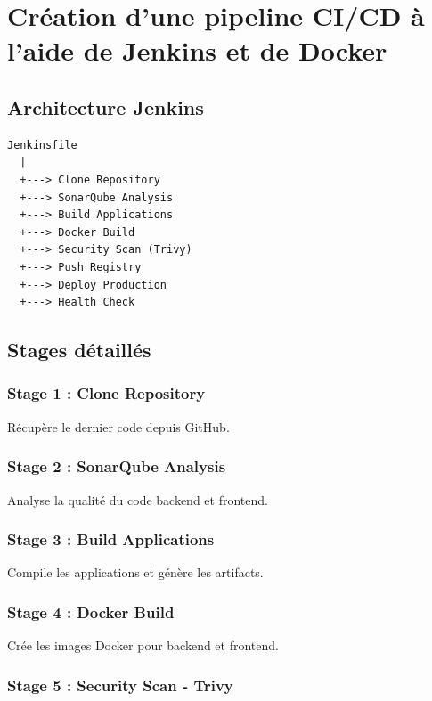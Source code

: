 \documentclass[12pt,a4paper]{report}
\begin{document}
\section{Création d'une pipeline CI/CD à l'aide de Jenkins et de Docker}

\subsection{Architecture Jenkins}

\begin{verbatim}
Jenkinsfile
  |
  +---> Clone Repository
  +---> SonarQube Analysis
  +---> Build Applications
  +---> Docker Build
  +---> Security Scan (Trivy)
  +---> Push Registry
  +---> Deploy Production
  +---> Health Check
\end{verbatim}

\subsection{Stages détaillés}

\subsubsection{Stage 1 : Clone Repository}

Récupère le dernier code depuis GitHub.

\subsubsection{Stage 2 : SonarQube Analysis}

Analyse la qualité du code backend et frontend.

\subsubsection{Stage 3 : Build Applications}

Compile les applications et génère les artifacts.

\subsubsection{Stage 4 : Docker Build}

Crée les images Docker pour backend et frontend.

\subsubsection{Stage 5 : Security Scan - Trivy}
\end{document}
